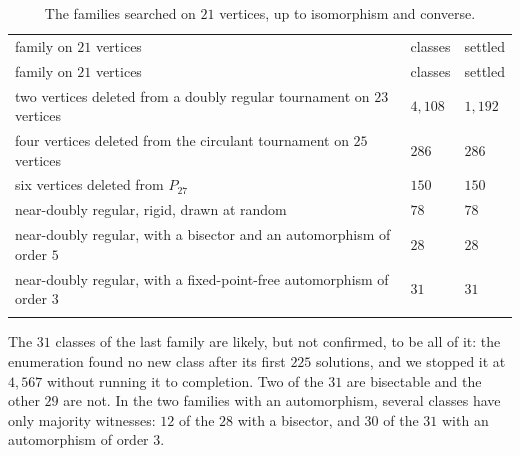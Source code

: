 \documentclass[
]{article}
\begin{document}
\begin{longtable}[]{@{}
  >{\raggedright\arraybackslash}p{}
  >{\raggedleft\arraybackslash}p{}
  >{\raggedleft\arraybackslash}p{}@{}}
\caption{The families searched on \(21\) vertices, up to isomorphism and
converse.}\tabularnewline*
\toprule\noalign{}
\begin{minipage}[b]{\linewidth}\raggedright
family on \(21\) vertices
\end{minipage} & \begin{minipage}[b]{\linewidth}\raggedleft
classes
\end{minipage} & \begin{minipage}[b]{\linewidth}\raggedleft
settled
\end{minipage} \\*
\midrule\noalign{}
\endfirsthead
\toprule\noalign{}
\begin{minipage}[b]{\linewidth}\raggedright
family on \(21\) vertices
\end{minipage} & \begin{minipage}[b]{\linewidth}\raggedleft
classes
\end{minipage} & \begin{minipage}[b]{\linewidth}\raggedleft
settled
\end{minipage} \\*
\midrule\noalign{}
\endhead
\bottomrule\noalign{}
\endlastfoot
two vertices deleted from a doubly regular tournament on \(23\) vertices
& \(4{,}108\) & \(1{,}192\) \\*
four vertices deleted from the circulant tournament on \(25\) vertices &
\(286\) & \(286\) \\*
six vertices deleted from \(P_{27}\) & \(150\) & \(150\) \\*
near-doubly regular, rigid, drawn at random & \(78\) & \(78\) \\*
near-doubly regular, with a bisector and an automorphism of order \(5\)
& \(28\) & \(28\) \\*
near-doubly regular, with a fixed-point-free automorphism of order \(3\)
& \(31\) & \(31\) \\*
\end{longtable}


The \(31\) classes of the last family are likely, but not confirmed, to
be all of it: the enumeration found no new class after its first \(225\)
solutions, and we stopped it at \(4{,}567\) without running it to
completion. Two of the \(31\) are bisectable and the other \(29\) are
not. In the two families with an automorphism, several classes have only
majority witnesses: \(12\) of the \(28\) with a bisector, and \(30\) of
the \(31\) with an automorphism of order \(3\).
\end{document}
